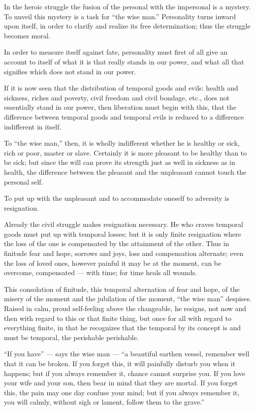 \documentclass[12pt,a4paper,openany]{book}
\newcommand{\opage}[1]{\marginnote{\footnotesize\textit{[#1]}}}
\begin{document}
\setcounter{footnote}{0}%
\opage{16}In the heroic struggle the fusion of the personal
with the impersonal is a mystery.
To unveil this mystery is a task
for ``the wise man.'' Personality turns
inward upon itself, in order to clarify and realize
its free determination; thus the
struggle becomes moral.

In order to measure itself against fate, personality must
first of all give an account to itself of what
it is that really stands in our power, and
what all that signifies which does not stand in our power.

If it is now seen that the distribution of temporal
goods and evils: health and sickness,
riches and poverty, civil freedom and civil
bondage, etc., does not essentially stand in
our power, then liberation must begin
with this, that the difference between temporal goods
and temporal evils is reduced to a difference indifferent
in itself.

To ``the wise man,'' then, it is wholly indifferent
whether he is healthy or sick, rich or poor,
master or slave. Certainly it is more pleasant
to be healthy than to be sick; but since the will
can prove its strength just as well in sickness
as in health, the difference between the
\setcounter{footnote}{0}%
\opage{17}pleasant and the unpleasant cannot touch the personal
self.

To put up with the unpleasant and to accommodate oneself
to adversity is resignation.

Already the civil struggle makes resignation
necessary. He who craves temporal
goods must put up with temporal losses; but it
is only finite resignation where the loss of the
one is compensated by the attainment of the other.
Thus in finitude fear and hope, sorrows
and joys, loss and compensation alternate; even the loss
of loved ones, however painful it may be at the moment,
can be overcome, compensated --- with time;
for time heals all wounds.

This consolation of finitude, this temporal
alternation of fear and hope, of the misery of the moment
and the jubilation of the moment, ``the wise man'' despises.
Raised in calm, proud self-feeling above the changeable,
he resigns, not now and then with
regard to this or that finite thing, but once
for all with regard to everything finite, in that he recognizes
that the temporal by its concept is and
must be temporal, the perishable perishable.

``If you have'' --- says the wise man --- ``a beautiful
\setcounter{footnote}{0}%
\opage{18}earthen vessel, remember well that it can be broken.
If you forget this, it will painfully
disturb you when it happens; but if you
always remember it, chance cannot surprise
you. If you love your wife and your son, then
bear in mind that they are mortal. If you forget this,
the pain may one day confuse your mind; but
if you always remember it, you will calmly, without
sigh or lament, follow them to the grave.''
\end{document}
